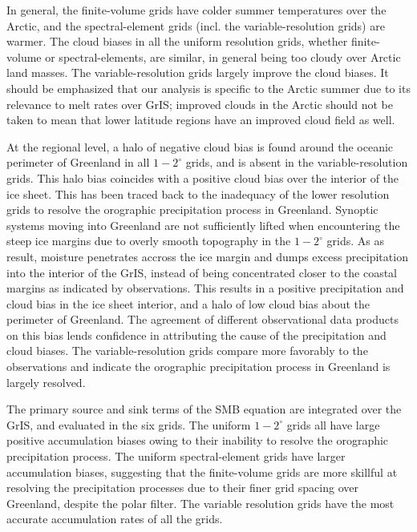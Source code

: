 \documentclass[draft]{agujournal2019}
\begin{document}
In general, the finite-volume grids have colder summer temperatures over the Arctic, and the spectral-element grids (incl. the variable-resolution grids) are warmer. The cloud biases in all the uniform resolution grids, whether finite-volume or spectral-elements, are similar, in general being too cloudy over Arctic land masses. The variable-resolution grids largely improve the cloud biases. It should be emphasized that our analysis is specific to the Arctic summer due to its relevance to melt rates over GrIS; improved clouds in the Arctic should not be taken to mean that lower latitude regions have an improved cloud field as well.

At the regional level, a halo of negative cloud bias is found around the oceanic perimeter of Greenland in all $1-2^{\circ}$ grids, and is absent in the variable-resolution grids. This halo bias coincides with a positive cloud bias over the interior of the ice sheet. This has been traced back to the inadequacy of the lower resolution grids to resolve the orographic precipitation process in Greenland. Synoptic systems moving into Greenland are not sufficiently lifted when encountering the steep ice margins due to overly smooth topography in the $1-2^{\circ}$ grids. As as result, moisture penetrates accross the ice margin and dumps excess precipitation into the interior of the GrIS, instead of being concentrated closer to the coastal margins as indicated by observations. This results in a positive precipitation and cloud bias in the ice sheet interior, and a halo of low cloud bias about the perimeter of Greenland. The agreement of different observational data products on this bias lends confidence  in attributing the cause of the precipitation and cloud biases. The variable-resolution grids compare more favorably to the observations and indicate the orographic precipitation process in Greenland is largely resolved.

The primary source and sink terms of the SMB equation are integrated over the GrIS, and evaluated in the six grids. The uniform $1-2^{\circ}$ grids all have large positive accumulation biases owing to their inability to resolve the orographic precipitation process. The uniform spectral-element grids have larger accumulation biases, suggesting that the finite-volume grids are more skillful at resolving the precipitation processes due to their finer grid spacing over Greenland, despite the polar filter. The variable resolution grids have the most accurate accumulation rates of all the grids. 
\end{document}
